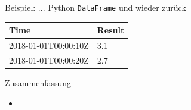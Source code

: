\documentclass{beamer}
\begin{document}
\begin{frame}[fragile]{Beispiel: ... Python \texttt{DataFrame} und wieder zurück}
	
	\begin{table}
		\begin{tabular}{|l|l|}
			\hline
			Time & Result \\
			\hline
			2018-01-01T00:00:10Z & 3.1 \\
			2018-01-01T00:00:20Z & 2.7 \\
			\hline
		\end{tabular}
	\end{table}
	
\end{frame}

\begin{frame}{Zusammenfassung}
	
	\begin{itemize}
		\item 
	\end{itemize}
	
\end{frame}
\end{document}
